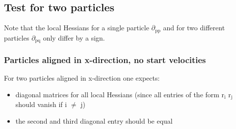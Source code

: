 \documentclass[11pt]{article}
\begin{document}
\subsection{Test for two particles}
\label{sec-1-4}
Note that the local Hessians for a single particle $\partial$$_{\text{pp}}$ and for two different particles $\partial$$_{\text{pq}}$ only differ by a sign.
\subsubsection{Particles aligned in x-direction, no start velocities}
\label{sec-1-4-1}
For two particles aligned in x-direction one expects:
\begin{itemize}
\item diagonal matrices for all local Hessians (since all entries of the form r$_{\text{i}}$ r$_{\text{j}}$ should vanish if i $\neq$ j)
\item the second and third diagonal entry should be equal
\end{itemize}
\end{document}
